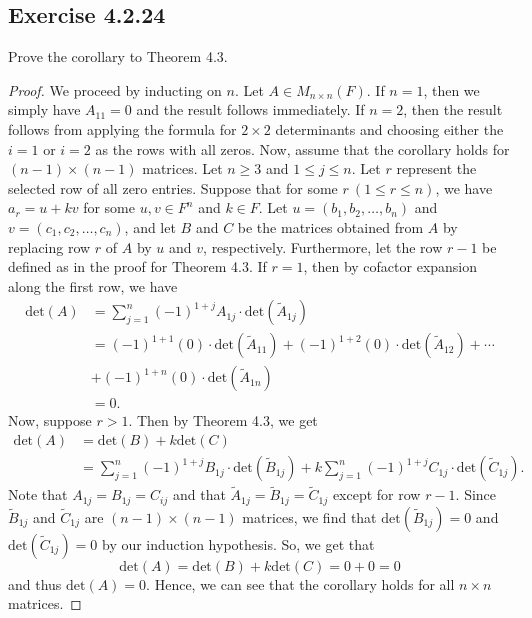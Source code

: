 \subsection*{Exercise 4.2.24} Prove the corollary to Theorem 4.3.
\begin{proof}
We proceed by inducting on \( n  \). Let \( {A} \in M_{n \times n}(F) \). If \( n = 1  \), then
we simply have \( {A}_{11} = 0  \) and the result follows immediately. If \( n = 2  \), then the result follows from applying the formula for \( 2 \times 2  \) determinants and choosing either the \( i=1  \) or \( i = 2  \) as the rows with all zeros. Now, assume that the corollary holds for \( (n-1) \times (n-1) \) matrices. Let \( n \geq 3  \) and \( 1 \leq j \leq n  \). Let \( r  \) represent the selected row of all zero entries. Suppose that for some \( r  \ (1 \leq r \leq n) \), we have \( {a}_{r} = u + kv  \) for some \( u,v \in F^{n} \) and \( k \in F  \). Let \( u = ({b}_{1}, {b}_{2}, \dots, {b}_{n}) \) and \( v = ({c}_{1}, {c}_{2}, \dots, {c}_{n}) \), and let \( B  \) and \( C  \) be the matrices obtained from \( A  \) by replacing row \( r  \) of \( A  \) by \( u \) and \( v  \), respectively. Furthermore, let the row \( r - 1  \) be defined as in the proof for Theorem 4.3. If \( r = 1  \), then by cofactor expansion along the first row, we have 
\begin{align*}  
    \text{det}(A) &= \sum_{ j=1 }^{ n } (-1)^{1+j} {A}_{1j} \cdot \text{det}({\tilde{A}}_{1j}) \\  
                  &= (-1)^{1+1} (0) \cdot \text{det}({\tilde{A}}_{11}) + (-1)^{1+2} (0) \cdot \text{det}({\tilde{A}}_{12}) + \cdots \\  
                  &+ (-1)^{1+n} (0) \cdot \text{det}({\tilde{A}}_{1n}) \\
                  &= 0. 
\end{align*}
Now, suppose \( r > 1  \). Then by Theorem 4.3, we get
\begin{align*}
    \text{det}(A) &= \text{det}(B) + k \text{det}(C)  \\
                  &= \sum_{ j=1 }^{ n }(-1)^{1+j} {B}_{1j} \cdot \text{det}({\tilde{B}}_{1j}) + k \sum_{ j=1 }^{ n } (-1)^{1+j} {C}_{1j} \cdot \text{det}({\tilde{C}}_{1j}).
\end{align*}
Note that \( {A}_{1j} = {B}_{1j} = {C}_{ij}  \) and that \( {\tilde{A}}_{1j} = {\tilde{B}}_{1j} = {\tilde{C}}_{1j}\) except for row \( r - 1  \). Since \( {\tilde{B}}_{1j}  \) and \( {\tilde{C}}_{1j} \) are \( (n-1) \times (n-1) \) matrices, we find that \( \text{det}({\tilde{B}}_{1j}) = 0  \) and \( \text{det}({\tilde{C}}_{1j}) = 0  \) by our induction hypothesis.  So, we get that
\[  \text{det}(A) = \text{det}(B) + k \text{det}(C) = 0 + 0 = 0 \]
and thus \( \text{det}(A) = 0  \). Hence, we can see that the corollary holds for all \( n \times n  \) matrices.
\end{proof}

